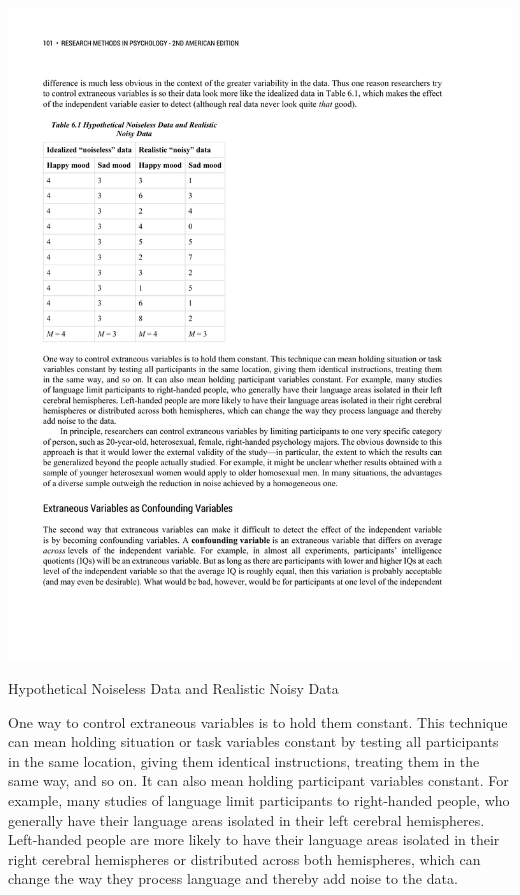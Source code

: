 \begin{marginfigure}[0in]
\includegraphics[width=\linewidth]{figures/C6noisydata.pdf}
\caption{Hypothetical Noiseless Data and Realistic Noisy Data}
\label{fig:noisydata}
\end{marginfigure}
 



One way to control extraneous variables is to hold them constant. This technique can mean holding situation or task variables constant by testing all participants in the same location, giving them identical instructions, treating them in the same way, and so on. It can also mean holding participant variables constant. For example, many studies of language limit participants to right-handed people, who generally have their language areas isolated in their left cerebral hemispheres. Left-handed people are more likely to have their language areas isolated in their right cerebral hemispheres or distributed across both hemispheres, which can change the way they process language and thereby add noise to the data.

